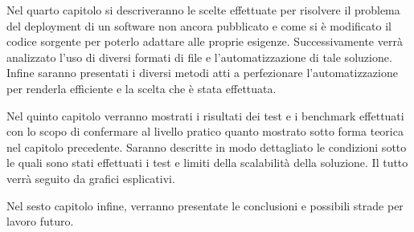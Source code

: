 \documentclass[../main.tex]{subfiles}
\begin{document}
Nel quarto capitolo si descriveranno le scelte effettuate per risolvere il problema del deployment di un software non ancora pubblicato e come si è modificato il codice sorgente per poterlo adattare alle proprie esigenze. Successivamente verrà analizzato l'uso di diversi formati di file e l'automatizzazione di tale soluzione. Infine saranno presentati i diversi metodi atti a perfezionare l'automatizzazione per renderla efficiente e la scelta che è stata effettuata.

Nel quinto capitolo verranno mostrati i risultati dei test e i benchmark effettuati con lo scopo di confermare al livello pratico quanto mostrato sotto forma teorica nel capitolo precedente. Saranno descritte in modo dettagliato le condizioni sotto le quali sono stati effettuati i test e limiti della scalabilità della soluzione. Il tutto verrà seguito da grafici esplicativi.

Nel sesto capitolo infine, verranno presentate le conclusioni e possibili strade per lavoro futuro.
\end{document}
